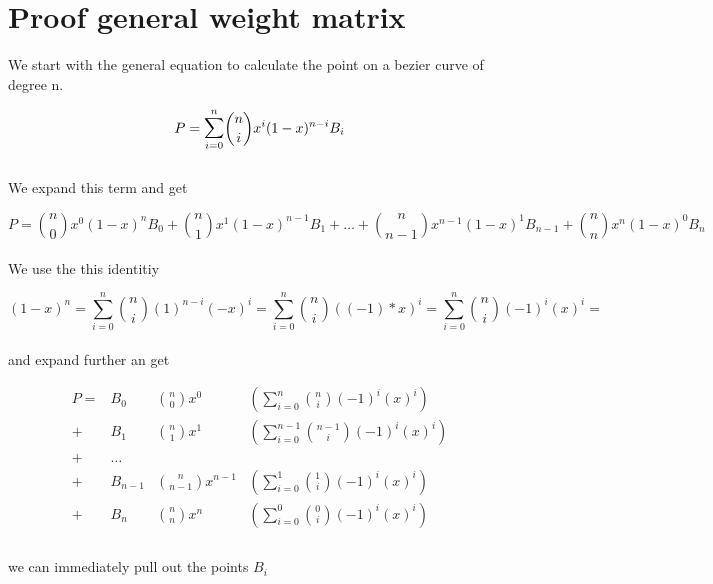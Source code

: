 \section{Proof general weight matrix}
\label{sec:proofgeneralweightmatrix}

We start with the general equation to calculate the point on a bezier curve of degree n.

\begin{equation*}
    P=\mathlarger{\sum}_{i = 0}^{n} {n \choose i}x^i (1-x)^{n-i} B_i
\end{equation*}
\\ We expand this term and get

\begin{equation*}
    P=
    {n \choose 0}x^0 (1-x)^{n} B_0 +
    {n \choose 1}x^1 (1-x)^{n - 1} B_1 +
    \dots +
    {n \choose n-1}x^{n-1} (1-x)^{1} B_{n-1} +
    {n \choose n}x^{n} (1-x)^{0} B_{n}
\end{equation*}
\\
We use the this identitiy

\begin{equation*}
    (1-x)^n =
    \sum_{i = 0}^{n} {n \choose i} (1)^{n-i}(-x)^{i} =
    \sum_{i = 0}^{n} {n \choose i} ((-1)*x)^{i} =
    \sum_{i = 0}^{n} {n \choose i} (-1)^{i}(x)^{i} =
\end{equation*}
\\
and expand further an get

\begin{align*}
    P= & B_0     & {n \choose 0}x^0       & ( \sum_{i = 0}^{n}   {n \choose i}    (-1)^{i}  (x)^{i}) \\
    +  & B_1     & {n \choose 1}x^1       & ( \sum_{i = 0}^{n-1} {n-1 \choose i}  (-1)^{i}  (x)^{i}) \\
    +  & \dots                                                                                       \\
    +  & B_{n-1} & {n \choose n-1}x^{n-1} & ( \sum_{i = 0}^{1}   {1 \choose i}    (-1)^{i}  (x)^{i}) \\
    +  & B_n     & {n \choose n}x^n       & ( \sum_{i = 0}^{0}   {0 \choose i}    (-1)^{i}  (x)^{i}) \\
\end{align*}
\\ we can immediately pull out the points $B_i$

